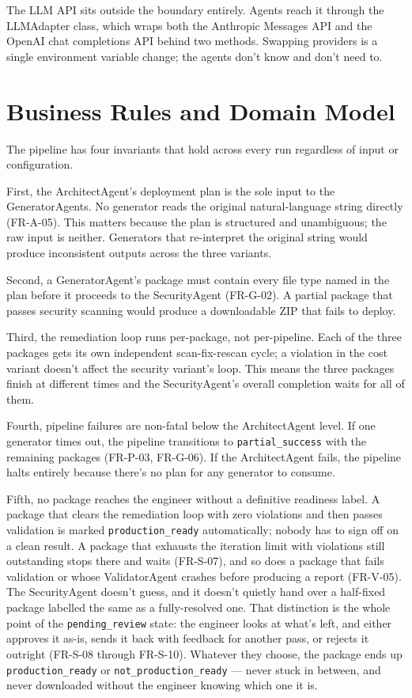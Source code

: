 The LLM API sits outside the boundary entirely. Agents reach it through the
LLMAdapter class, which wraps both the Anthropic Messages API and the OpenAI
chat completions API behind two methods. Swapping providers is a single
environment variable change; the agents don't know and don't need to.

\section{Business Rules and Domain Model}
\label{sec:domain}
\label{sec:class-design}

The pipeline has four invariants that hold across every run regardless of
input or configuration.

First, the ArchitectAgent's deployment plan is the sole input to the
GeneratorAgents. No generator reads the original natural-language string
directly (FR-A-05). This matters because the plan is structured and
unambiguous; the raw input is neither. Generators that re-interpret the
original string would produce inconsistent outputs across the three variants.

Second, a GeneratorAgent's package must contain every file type named in the
plan before it proceeds to the SecurityAgent (FR-G-02). A partial package
that passes security scanning would produce a downloadable ZIP that fails to
deploy.

Third, the remediation loop runs per-package, not per-pipeline. Each of the
three packages gets its own independent scan-fix-rescan cycle; a violation in
the cost variant doesn't affect the security variant's loop. This means the
three packages finish at different times and the SecurityAgent's overall
completion waits for all of them.

Fourth, pipeline failures are non-fatal below the ArchitectAgent level.
If one generator times out, the pipeline transitions to
\texttt{partial\_success} with the remaining packages (FR-P-03, FR-G-06).
If the ArchitectAgent fails, the pipeline halts entirely because there's no
plan for any generator to consume.

Fifth, no package reaches the engineer without a definitive readiness label.
A package that clears the remediation loop with zero violations and then
passes validation is marked \texttt{production\_ready} automatically; nobody
has to sign off on a clean result. A package that exhausts the iteration
limit with violations still outstanding stops there and waits (FR-S-07), and
so does a package that fails validation or whose ValidatorAgent crashes
before producing a report (FR-V-05). The SecurityAgent doesn't
guess, and it doesn't quietly hand over a half-fixed package labelled the
same as a fully-resolved one. That distinction is the whole point of the
\texttt{pending\_review} state: the engineer looks at what's left, and
either approves it as-is, sends it back with feedback for another pass, or
rejects it outright (FR-S-08 through FR-S-10). Whatever they choose, the
package ends up \texttt{production\_ready} or \texttt{not\_production\_ready}
--- never stuck in between, and never downloaded without the engineer
knowing which one it is.

